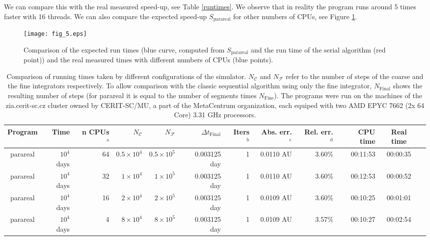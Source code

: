 \documentclass[conference]{IEEEtran}
\begin{document}
We can compare this with the real measured speed-up, see Table \ref{runtimes}. We observe that in reality the program runs around 5 times faster with 16 threads. We can also compare the expected speed-up $S_\text{parareal}$ for other numbers of CPUs, see Figure \ref{speeds}.

\begin{figure}[htbp]
\centerline{\texttt{[image: fig\_5.eps]}}
\caption{Comparison of the expected run times (blue curve, computed from $S_\text{parareal}$ and the run time of the serial algorithm (red point)) and the real measured times with different numbers of CPUs (blue points).}
\label{speeds}
\end{figure}

\begin{table*}[htbp]
\caption{Comparison of running times taken by different configurations of the simulator. 
$N_\mathcal{C}$ and $N_\mathcal{F}$ refer to the number of steps of the coarse and the fine integrators respectively. 
To allow comparison with the classic sequential algorithm using only the fine integrator, $N_{\text{Final}}$ shows the resulting number of steps (for parareal it is equal to the number of segments times $N_\text{Fine}$).
The programs were run on the machines of the zia.cerit-sc.cz cluster owned by CERIT-SC/MU, a part of the MetaCentrum organization, each equiped with two AMD EPYC 7662 (2x 64 Core) 3.31 GHz processors.}
\begin{center}
\begin{tabular}{crrrrrrrrrcc}
\toprule
Program & Time & n CPUs $^{\mathrm{a}}$ & $N_\mathcal{C}$ & $N_\mathcal{F}$ & $\Delta t_{\text{Final}}$ & Iters $^{\mathrm{b}}$ & Abs. err. $^{\mathrm{c}}$ & Rel. err. $^{\mathrm{d}}$ & CPU time & Real time \\
\midrule
parareal & $10^4$ days & 64 & $0.5\times10^4$ &  $0.5\times10^5$ & 0.003125 day & 1 & 0.0110 AU & 3.60\% & 00:11:53 & 00:00:35 \\
parareal & $10^4$ days & 32 & $1\times10^4$ &  $1\times10^5$ & 0.003125 day & 1 & 0.0110 AU & 3.60\% & 00:12:53 & 00:00:52 \\
parareal & $10^4$ days & 16 & $2\times10^4$ &  $2\times10^5$ & 0.003125 day & 1 & 0.0109 AU & 3.60\% & 00:10:25 & 00:01:01 \\
parareal & $10^4$ days & 4 & $8\times10^4$ &  $8\times10^5$ & 0.003125 day & 1 & 0.0109 AU & 3.57\% & 00:10:27 & 00:02:54 \\

\end{tabular}
\end{center}
\end{table*}
\end{document}
